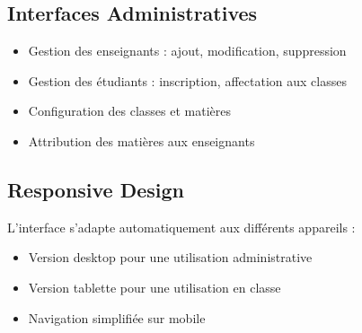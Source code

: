 \subsection{Interfaces Administratives}
\begin{itemize}
    \item Gestion des enseignants : ajout, modification, suppression
    \item Gestion des étudiants : inscription, affectation aux classes
    \item Configuration des classes et matières
    \item Attribution des matières aux enseignants
\end{itemize}

\subsection{Responsive Design}
L'interface s'adapte automatiquement aux différents appareils :
\begin{itemize}
    \item Version desktop pour une utilisation administrative
    \item Version tablette pour une utilisation en classe
    \item Navigation simplifiée sur mobile
\end{itemize}
